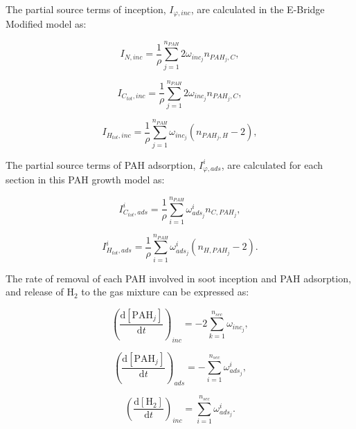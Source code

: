 The partial source terms of inception, $I_{\varphi, inc}$, are calculated in the E-Bridge Modified model as: 

\begin{equation}
	I_{N,{inc}} = \frac{1}{\rho}
	\sum_{j=1}^{n_{PAH}}
	2\omega_{inc_{j}}
	n_{PAH_j,C}
	\label{eqn:IN_inc_ebri},
\end{equation}

\begin{equation}
	I_{C_{tot},{inc}} = \frac{1}{\rho}
	\sum_{j=1}^{n_{PAH}}
	2\omega_{inc_{j}} 
	n_{PAH_j,C}
	\label{eqn:ICtot_inc_ebri},
\end{equation}

\begin{equation}
	I_{H_{tot},{inc}} = \frac{1}{\rho}
	\sum_{j=1}^{n_{PAH}}
	\omega_{inc_{j}} 
	\left(
	n_{PAH_j,H}-2
	\right)
	\label{eqn:IHtot_inc_ebri},
\end{equation}


The partial source terms of PAH adsorption, $I^i_{\varphi, ads}$, are calculated for each section in this PAH growth model as: 

\begin{equation}
	I^i_{C_{tot},ads} =
	\frac{1}{\rho}
	\sum_{i=1}^{n_{PAH}}
	\omega^i_{ads_j}
	n_{C,PAH_j}
	\label{eqn:ICtotads_ebri},
\end{equation}

\begin{equation}
	I^i_{H_{tot},ads} =
	\frac{1}{\rho}
	\sum_{i=1}^{n_{PAH}}
	\omega^i_{ads_j}
	\left(n_{H,PAH_j}-2\right)
	\label{eqn:IHtotads_ebri}.
\end{equation}

The rate of removal of each PAH involved in soot inception and PAH adsorption, and release of $\mathrm{H_2}$ to the gas mixture can be expressed as:

\begin{equation}
	\left(
	\frac{\mathrm{d}\left[{\mathrm{PAH}_j}\right]}{\mathrm{d}t}
	\right)_{inc}
	= 
	-2\sum_{k=1}^{n_{sec}}\omega_{inc_{j}},
\end{equation}

\begin{equation}
	\left(
	\frac{\mathrm{d}\left[{\mathrm{PAH}_j}\right]}{\mathrm{d}t}
	\right)_{ads}
	= 
	-\sum_{i=1}^{n_{sec}}\omega^i_{ads_j},
	\label{eqn:PAHscrub_ebri_ads}
\end{equation}

\begin{equation}
	\left(
	\frac{\mathrm{d}\left[{\mathrm{H_2}}\right]}{\mathrm{d}t}
	\right)_{inc}
	= 
	\sum_{i=1}^{n_{sec}}\omega^i_{ads_j}.
	\label{eqn:H2scrub_ebri}
\end{equation}

